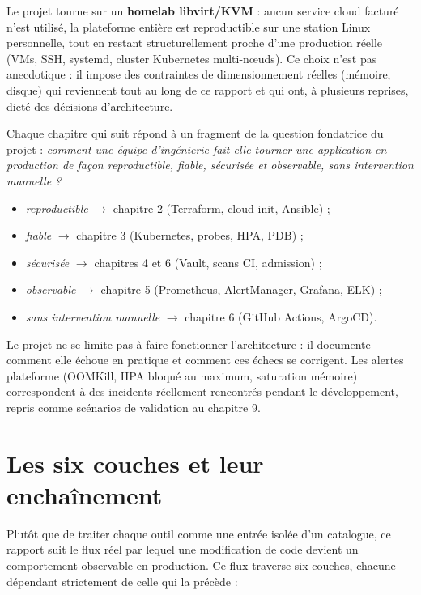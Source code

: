 \documentclass[12pt,a4paper,twoside,openright]{report}
\begin{document}
Le projet tourne sur un \textbf{homelab libvirt/KVM} : aucun service cloud facturé
n'est utilisé, la plateforme entière est reproductible sur une station Linux
personnelle, tout en restant structurellement proche d'une production réelle (VMs,
SSH, systemd, cluster Kubernetes multi-nœuds). Ce choix n'est pas anecdotique : il
impose des contraintes de dimensionnement réelles (mémoire, disque) qui reviennent
tout au long de ce rapport et qui ont, à plusieurs reprises, dicté des décisions
d'architecture.

Chaque chapitre qui suit répond à un fragment de la question fondatrice du projet :
\emph{comment une équipe d'ingénierie fait-elle tourner une application en
production de façon reproductible, fiable, sécurisée et observable, sans
intervention manuelle ?}

\begin{itemize}[itemsep=1pt]
  \item \emph{reproductible} $\rightarrow$ chapitre 2 (Terraform, cloud-init,
        Ansible) ;
  \item \emph{fiable} $\rightarrow$ chapitre 3 (Kubernetes, probes, HPA, PDB) ;
  \item \emph{sécurisée} $\rightarrow$ chapitres 4 et 6 (Vault, scans CI, admission) ;
  \item \emph{observable} $\rightarrow$ chapitre 5 (Prometheus, AlertManager,
        Grafana, ELK) ;
  \item \emph{sans intervention manuelle} $\rightarrow$ chapitre 6 (GitHub Actions,
        ArgoCD).
\end{itemize}

\begin{whybox}[title={Philosophie : documenter aussi les échecs}]
Le projet ne se limite pas à faire fonctionner l'architecture : il documente comment
elle échoue en pratique et comment ces échecs se corrigent. Les alertes plateforme
(OOMKill, HPA bloqué au maximum, saturation mémoire) correspondent à des incidents
réellement rencontrés pendant le développement, repris comme scénarios de validation
au chapitre 9.
\end{whybox}

\section{Les six couches et leur enchaînement}

Plutôt que de traiter chaque outil comme une entrée isolée d'un catalogue, ce
rapport suit le flux réel par lequel une modification de code devient un
comportement observable en production. Ce flux traverse six couches, chacune
dépendant strictement de celle qui la précède :
\end{document}
